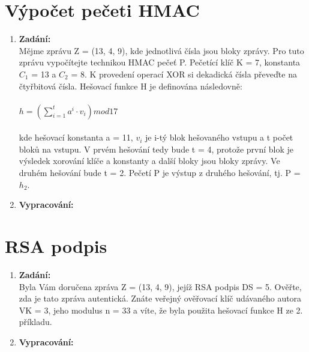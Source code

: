 \documentclass[10pt, a4paper]{article}%
\begin{document}
	\section*{\large{\textbf{Výpočet pečeti HMAC}}}
		\begin{enumerate}
			\item \textbf{Zadání:}\\
				Mějme zprávu Z = (13, 4, 9), kde jednotlivá čísla jsou bloky zprávy. Pro tuto zprávu vypočítejte
				technikou HMAC pečeť P. Pečetící klíč K = 7, konstanta $C_1$ = 13 a $C_2$ = 8. K provedení operací
				XOR si dekadická čísla převeďte na čtyřbitová čísla. Hešovací funkce H je definována následovně:\\\\
				$h = \left( \sum_{i = 1}^{t}  a^i \cdot v_i \right) mod 17$\\\\
				kde hešovací konstanta a = 11, $v_i$ je i-tý blok hešovaného vstupu a t počet bloků na vstupu. V prvém
				hešování tedy bude t = 4, protože první blok je výsledek xorování klíče a konstanty a další bloky
				jsou bloky zprávy. Ve druhém hešování bude t = 2. Pečetí P je výstup z druhého hešování, tj. P = $h_2$.
				\item \textbf{Vypracování:}\\
		\end{enumerate}

		\section*{\large{\textbf{RSA podpis}}}
		\begin{enumerate}
			\item \textbf{Zadání:}\\
				Byla Vám doručena zpráva Z = (13, 4, 9), jejíž RSA podpis DS = 5. Ověřte, zda je tato zpráva
				autentická. Znáte veřejný ověřovací klíč udávaného autora VK = 3, jeho modulus n = 33 a víte, že
				byla použita hešovací funkce H ze 2. příkladu.
			\item \textbf{Vypracování:}\\

		\end{enumerate}
\end{document}

